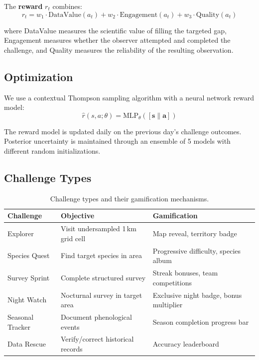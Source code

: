 \documentclass[11pt,a4paper]{article}
\begin{document}
The \textbf{reward} $r_t$ combines:
\begin{equation}
  r_t = w_1 \cdot \text{DataValue}(a_t) + w_2 \cdot \text{Engagement}(a_t)
  + w_3 \cdot \text{Quality}(a_t)
  \label{eq:reward}
\end{equation}

where DataValue measures the scientific value of filling the targeted
gap, Engagement measures whether the observer attempted and completed
the challenge, and Quality measures the reliability of the resulting
observation.

\subsection{Optimization}

We use a contextual Thompson sampling algorithm
\citep{agrawal2013thompson} with a neural network reward model:
\begin{equation}
  \hat{r}(s, a; \theta) = \text{MLP}_\theta([\mathbf{s} \| \mathbf{a}])
\end{equation}

The reward model is updated daily on the previous day's challenge
outcomes. Posterior uncertainty is maintained through an ensemble of
5 models with different random initializations.

\subsection{Challenge Types}

\begin{table}[H]
\centering
\caption{Challenge types and their gamification mechanisms.}
\label{tab:challenges}
\begin{tabular}{p{2.5cm}p{4cm}p{4.5cm}}
\toprule
\textbf{Challenge} & \textbf{Objective} & \textbf{Gamification} \\
\midrule
Explorer & Visit undersampled 1\,km grid cell & Map reveal, territory
  badge \\
Species Quest & Find target species in area & Progressive difficulty,
  species album \\
Survey Sprint & Complete structured survey & Streak bonuses, team
  competitions \\
Night Watch & Nocturnal survey in target area & Exclusive night badge,
  bonus multiplier \\
Seasonal Tracker & Document phenological events & Season completion
  progress bar \\
Data Rescue & Verify/correct historical records & Accuracy leaderboard \\
\bottomrule
\end{tabular}
\end{table}
\end{document}

